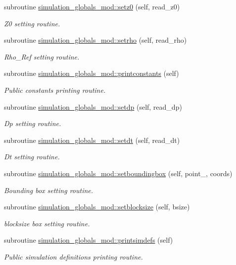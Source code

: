 \begin{DoxyCompactItemize}
subroutine \mbox{\hyperlink{namespacesimulation__globals__mod_a64b1d91147c1cd5898fec8f23d56a65d}{simulation\+\_\+globals\+\_\+mod\+::setz0}} (self, read\+\_\+z0)
\begin{DoxyCompactList}\small\item\em Z0 setting routine. \end{DoxyCompactList}\item 
subroutine \mbox{\hyperlink{namespacesimulation__globals__mod_a68a87c39cf88bad353e28e367a721ed4}{simulation\+\_\+globals\+\_\+mod\+::setrho}} (self, read\+\_\+rho)
\begin{DoxyCompactList}\small\item\em Rho\+\_\+\+Ref setting routine. \end{DoxyCompactList}\item 
subroutine \mbox{\hyperlink{namespacesimulation__globals__mod_a20ba28d72a9bea823d9373a94f97026e}{simulation\+\_\+globals\+\_\+mod\+::printconstants}} (self)
\begin{DoxyCompactList}\small\item\em Public constants printing routine. \end{DoxyCompactList}\item 
subroutine \mbox{\hyperlink{namespacesimulation__globals__mod_acb8e3762572266b40a0deb166dded33a}{simulation\+\_\+globals\+\_\+mod\+::setdp}} (self, read\+\_\+dp)
\begin{DoxyCompactList}\small\item\em Dp setting routine. \end{DoxyCompactList}\item 
subroutine \mbox{\hyperlink{namespacesimulation__globals__mod_aecf75eeccef4eeae6d10ab26cf2dcfcf}{simulation\+\_\+globals\+\_\+mod\+::setdt}} (self, read\+\_\+dt)
\begin{DoxyCompactList}\small\item\em Dt setting routine. \end{DoxyCompactList}\item 
subroutine \mbox{\hyperlink{namespacesimulation__globals__mod_a412b0779703630189e2ea14e4b390864}{simulation\+\_\+globals\+\_\+mod\+::setboundingbox}} (self, point\+\_\+, coords)
\begin{DoxyCompactList}\small\item\em Bounding box setting routine. \end{DoxyCompactList}\item 
subroutine \mbox{\hyperlink{namespacesimulation__globals__mod_aa65b43534d2d2b6366a4ebc791194805}{simulation\+\_\+globals\+\_\+mod\+::setblocksize}} (self, bsize)
\begin{DoxyCompactList}\small\item\em blocksize box setting routine. \end{DoxyCompactList}\item 
subroutine \mbox{\hyperlink{namespacesimulation__globals__mod_ad331ccf019de7ed531e37c655600f90f}{simulation\+\_\+globals\+\_\+mod\+::printsimdefs}} (self)
\begin{DoxyCompactList}\small\item\em Public simulation definitions printing routine. \end{DoxyCompactList}\end{DoxyCompactItemize}

